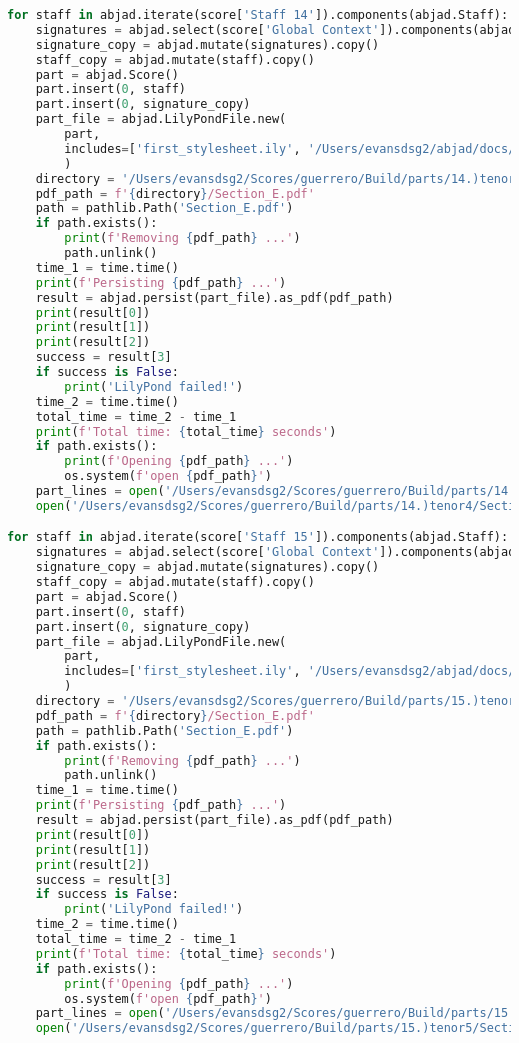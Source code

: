 \begin{lstlisting}[language=Python, caption=Invocation Source Code]
for staff in abjad.iterate(score['Staff 14']).components(abjad.Staff):
    signatures = abjad.select(score['Global Context']).components(abjad.Staff)
    signature_copy = abjad.mutate(signatures).copy()
    staff_copy = abjad.mutate(staff).copy()
    part = abjad.Score()
    part.insert(0, staff)
    part.insert(0, signature_copy)
    part_file = abjad.LilyPondFile.new(
        part,
        includes=['first_stylesheet.ily', '/Users/evansdsg2/abjad/docs/source/_stylesheets/abjad.ily'],
        )
    directory = '/Users/evansdsg2/Scores/guerrero/Build/parts/14.)tenor4'
    pdf_path = f'{directory}/Section_E.pdf'
    path = pathlib.Path('Section_E.pdf')
    if path.exists():
        print(f'Removing {pdf_path} ...')
        path.unlink()
    time_1 = time.time()
    print(f'Persisting {pdf_path} ...')
    result = abjad.persist(part_file).as_pdf(pdf_path)
    print(result[0])
    print(result[1])
    print(result[2])
    success = result[3]
    if success is False:
        print('LilyPond failed!')
    time_2 = time.time()
    total_time = time_2 - time_1
    print(f'Total time: {total_time} seconds')
    if path.exists():
        print(f'Opening {pdf_path} ...')
        os.system(f'open {pdf_path}')
    part_lines = open('/Users/evansdsg2/Scores/guerrero/Build/parts/14.)tenor4/Section_E.ly').readlines()
    open('/Users/evansdsg2/Scores/guerrero/Build/parts/14.)tenor4/Section_E.ly', 'w').writelines(part_lines[15:-1])

for staff in abjad.iterate(score['Staff 15']).components(abjad.Staff):
    signatures = abjad.select(score['Global Context']).components(abjad.Staff)
    signature_copy = abjad.mutate(signatures).copy()
    staff_copy = abjad.mutate(staff).copy()
    part = abjad.Score()
    part.insert(0, staff)
    part.insert(0, signature_copy)
    part_file = abjad.LilyPondFile.new(
        part,
        includes=['first_stylesheet.ily', '/Users/evansdsg2/abjad/docs/source/_stylesheets/abjad.ily'],
        )
    directory = '/Users/evansdsg2/Scores/guerrero/Build/parts/15.)tenor5'
    pdf_path = f'{directory}/Section_E.pdf'
    path = pathlib.Path('Section_E.pdf')
    if path.exists():
        print(f'Removing {pdf_path} ...')
        path.unlink()
    time_1 = time.time()
    print(f'Persisting {pdf_path} ...')
    result = abjad.persist(part_file).as_pdf(pdf_path)
    print(result[0])
    print(result[1])
    print(result[2])
    success = result[3]
    if success is False:
        print('LilyPond failed!')
    time_2 = time.time()
    total_time = time_2 - time_1
    print(f'Total time: {total_time} seconds')
    if path.exists():
        print(f'Opening {pdf_path} ...')
        os.system(f'open {pdf_path}')
    part_lines = open('/Users/evansdsg2/Scores/guerrero/Build/parts/15.)tenor5/Section_E.ly').readlines()
    open('/Users/evansdsg2/Scores/guerrero/Build/parts/15.)tenor5/Section_E.ly', 'w').writelines(part_lines[15:-1])


\end{lstlisting}
